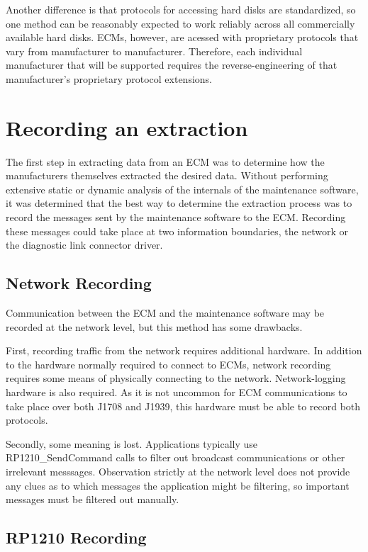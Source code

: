 Another difference is that protocols for accessing hard disks are standardized, so one method can be reasonably expected
to work reliably across all commercially available hard disks. ECMs, however, are acessed with proprietary protocols that
vary from manufacturer to manufacturer. Therefore, each individual manufacturer that will be supported requires the
reverse-engineering of that manufacturer's proprietary protocol extensions.

\section{Recording an extraction}

The first step in extracting data from an ECM was to determine how the manufacturers themselves extracted
the desired data. Without performing extensive static or dynamic analysis of the internals of the maintenance
software, it was determined that the best way to determine the extraction process was to record the messages
sent by the maintenance software to the ECM. Recording these messages could take place at two information boundaries,
the network or the diagnostic link connector driver.

\subsection{Network Recording}

Communication between the ECM and the maintenance software may be recorded at the network level, but this method
has some drawbacks.

First, recording traffic from the network requires additional hardware. In addition to the hardware normally required
to connect to ECMs, network recording requires some means of physically connecting to the network. Network-logging
hardware is also required. As it is not uncommon for ECM communications to take place over both J1708 and J1939, 
this hardware must be able to record both protocols.

Secondly, some meaning is lost. Applications typically use RP1210\_SendCommand calls to filter out broadcast communications
or other irrelevant messsages. Observation strictly at the network level does not provide any clues as to which messages
the application might be filtering, so important messages must be filtered out manually.

\subsection{RP1210 Recording}

